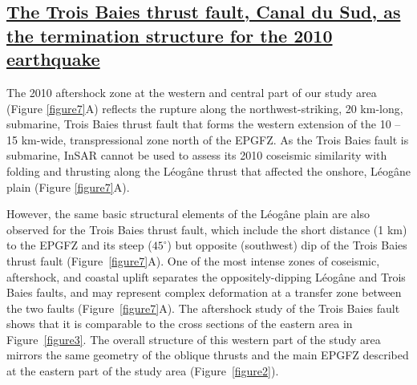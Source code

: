\documentclass[linenumbers,draft]{agujournal}
\begin{document}
\subsection{\ul{The Trois Baies thrust fault, Canal du Sud, as the termination structure for the 2010 earthquake}}
The 2010 aftershock zone at the western and central part of our study area (Figure \ref{figure7}A) reflects the rupture along the northwest-striking, 20 km-long, submarine, Trois Baies thrust fault that forms the western extension of the 10 -- 15 km-wide, transpressional zone north of the EPGFZ. As the Trois Baies fault is submarine, InSAR cannot be used to assess its 2010 coseismic similarity with folding and thrusting along the L\'eog\^ane thrust that affected the onshore, L\'eog\^ane plain (Figure \ref{figure7}A). 

However, the same basic structural elements of the L\'eog\^ane plain are also observed for the Trois Baies thrust fault, which include the short distance (1 km) to the EPGFZ and its steep ($45^{\circ}$) but opposite (southwest) dip of the Trois Baies thrust fault (Figure~\ref{figure7}A). One of the most intense zones of coseismic, aftershock, and coastal uplift separates the oppositely-dipping L\'eog\^ane and Trois Baies faults, and may represent complex deformation at a transfer zone between the two faults (Figure~\ref{figure7}A). The aftershock study of the Trois Baies fault \citep{symithe2016present} shows that it is comparable to the cross sections of the eastern area in Figure~\ref{figure3}. The overall structure of this western part of the study area mirrors the same geometry of the oblique thrusts and the main EPGFZ described at the eastern part of the study area (Figure~\ref{figure2}).
\end{document}

